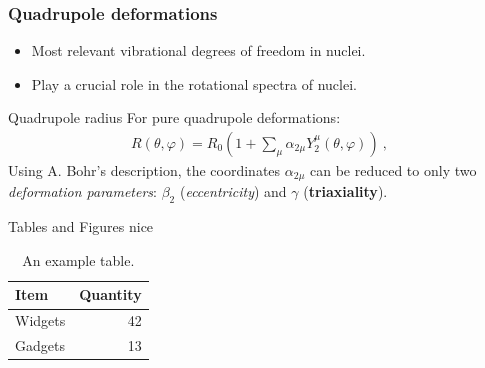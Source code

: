 \documentclass{beamer}
\begin{document}
\begin{frame}
  \frametitle{Quadrupole deformations}
  \begin{itemize}
    \item Most relevant vibrational degrees of freedom in nuclei.
    \item Play a crucial role in the rotational spectra of nuclei.
  \end{itemize}
\begin{block}{Quadrupole radius}
  For pure quadrupole deformations:
  \begin{align}
    R(\theta,\varphi)=R_0\left(1+\sum_\mu\alpha_{2\mu}Y_2^\mu(\theta,\varphi)\right)\ ,
  \end{align}
  Using A. Bohr's description, the coordinates $\alpha_{2\mu}$ can be reduced to only two \emph{deformation parameters}: $\beta_2$ (\emph{eccentricity}) and $\gamma$ (\textbf{triaxiality}).
\end{block}
\end{frame}

\begin{frame}{Tables and Figures}
nice

\begin{table}
\centering
\begin{tabular}{l|r}
Item & Quantity \\\hline
Widgets & 42 \\
Gadgets & 13
\end{tabular}
\caption{\label{tab:widgets}An example table.}
\end{table}

\end{frame}
\end{document}
